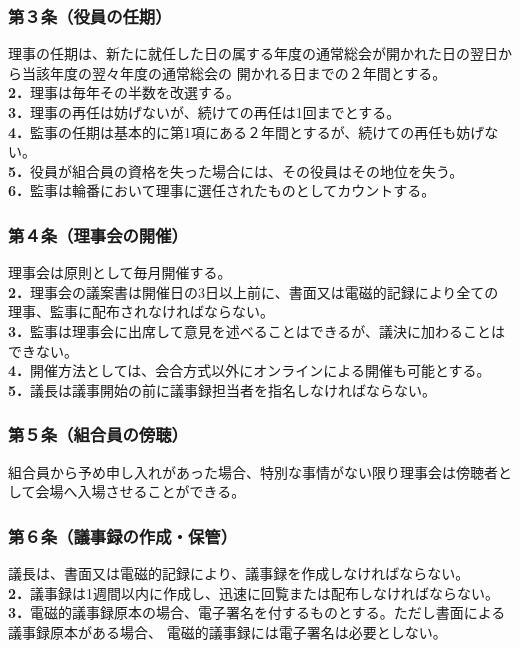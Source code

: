 \documentclass[12pt,uplatex]{jsarticle}
\begin{document}
\subsubsection*{ 第３条（役員の任期）}
理事の任期は、新たに就任した日の属する年度の通常総会が開かれた日の翌日から当該年度の翌々年度の通常総会の
開かれる日までの２年間とする。\\
\textbf{2．}理事は毎年その半数を改選する。\\
\textbf{3．}理事の再任は妨げないが、続けての再任は1回までとする。\\
\textbf{4．}監事の任期は基本的に第1項にある２年間とするが、続けての再任も妨げない。\\
\textbf{5．}役員が組合員の資格を失った場合には、その役員はその地位を失う。\\
\textbf{6．}監事は輪番において理事に選任されたものとしてカウントする。\\
\subsubsection*{ 第４条（理事会の開催）}
理事会は原則として毎月開催する。\\
\textbf{2．}理事会の議案書は開催日の3日以上前に、書面又は電磁的記録により全ての理事、監事に配布されなければならない。\\
\textbf{3．}監事は理事会に出席して意見を述べることはできるが、議決に加わることはできない。\\
\textbf{4．}開催方法としては、会合方式以外にオンラインによる開催も可能とする。\\
\textbf{5．}議長は議事開始の前に議事録担当者を指名しなければならない。\\
\subsubsection*{ 第５条（組合員の傍聴）}
組合員から予め申し入れがあった場合、特別な事情がない限り理事会は傍聴者として会場へ入場させることができる。
\subsubsection*{ 第６条（議事録の作成・保管）}
議長は、書面又は電磁的記録により、議事録を作成しなければならない。\\
\textbf{2．}議事録は1週間以内に作成し、迅速に回覧または配布しなければならない。\\
\textbf{3．}電磁的議事録原本の場合、電子署名を付するものとする。ただし書面による議事録原本がある場合、
電磁的議事録には電子署名は必要としない。\\
\end{document}
